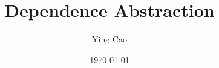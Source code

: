 \documentclass {article}
\title{Dependence Abstraction}
\author{Ying Cao}
\date{\today}
\begin{document}
\maketitle
\tableofcontents
\newpage


{
\small
\raggedright

\begin{spacing}{1}

\end{spacing}
}
\end{document}
